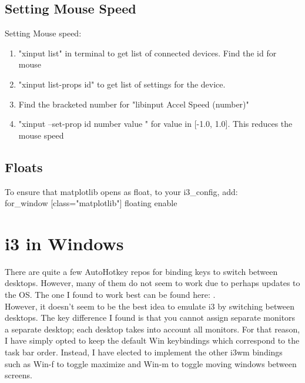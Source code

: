 \subsection{Setting Mouse Speed}
Setting Mouse speed:
\begin{enumerate}
    \item "xinput list" in terminal to get list of connected devices. Find the id for mouse
    \item "xinput list-props \tlangle id\trangle" to get list of settings for the device.
    \item Find the bracketed number for "libinput Accel Speed (\tlangle number\trangle)"
    \item "xinput --set-prop \tlangle id \trangle \tlangle number \trangle
        \tlangle value \trangle" for value in [-1.0, 1.0]. This reduces the mouse speed
\end{enumerate}

\subsection{Floats}
To ensure that matplotlib opens as float, to your i3\_config, add:\\

for\_window [class="matplotlib"] floating enable\\

\section{i3 in Windows}
There are quite a few AutoHotkey repos for binding keys to switch between
desktops. However, many of them do not seem to work due to perhaps updates to
the OS. The one I found to work best can be found here:
\cite{pmb6tz2020windows}.\\

However, it doesn't seem to be the best idea to emulate i3 by switching between
desktops. The key difference I found is that you cannot assign separate monitors
a separate desktop; each desktop takes into account all monitors. For that
reason, I have simply opted to keep the default Win keybindings which correspond
to the task bar order. Instead, I have elected to implement the other i3wm
bindings such as Win-f to toggle maximize and Win-m to toggle moving windows
between screens.

